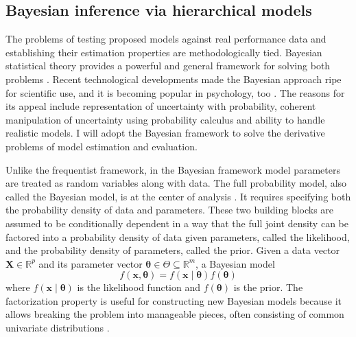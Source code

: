 \documentclass[12pt]{article}
\begin{document}
\subsection{Bayesian inference via hierarchical models}
	The problems of testing proposed models against real performance data and establishing their estimation properties are methodologically tied. Bayesian statistical theory provides a powerful and general framework for solving both problems \citep{Ber1997,GelCar2013}. Recent technological developments made the Bayesian approach ripe for scientific use, and it is becoming popular in psychology, too \citep{EdwLin1963,MyuPit1997,MyuKar2008,PerVan2002,RouLu2005,RouLu22005,CraPer2010,VanTue2011}. The reasons for its appeal include representation of uncertainty with probability, coherent manipulation of uncertainty using probability calculus and ability to handle realistic models. I will adopt the Bayesian framework to solve the derivative problems of model estimation and evaluation.
	
    Unlike the frequentist framework, in the Bayesian framework model parameters are treated as random variables along with data. The full probability model, also called the Bayesian model, is at the center of analysis \citep{GelCar2013}. It requires specifying both the probability density of data and parameters. These two building blocks are assumed to be conditionally dependent in a way that the full joint density can be factored into a probability density of data given parameters, called the likelihood, and the probability density of parameters, called the prior. Given a data vector $\boldsymbol{X} \in \mathbb{R}^p$ and its parameter vector $\boldsymbol{\theta} \in \Theta \subseteq \mathbb{R}^m$, a Bayesian model
\begin{equation}
f(\boldsymbol{x}, \boldsymbol{\theta}) = f(\boldsymbol{x} \mid \boldsymbol{\theta})f(\boldsymbol{\theta})
\end{equation}
where $f(\boldsymbol{x} \mid \boldsymbol{\theta})$ is the likelihood function and $f(\boldsymbol{\theta})$ is the prior. The factorization property is useful for constructing new Bayesian models because it allows breaking the problem into manageable pieces, often consisting of common univariate distributions \citep{JohKot1994,JohKot1995}. 
\end{document}
